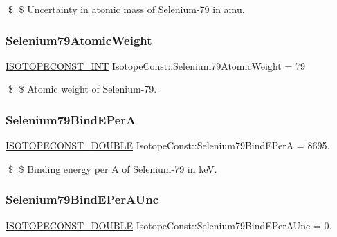 \$ \$ Uncertainty in atomic mass of Selenium-\/79 in amu. \mbox{\label{group___isotope_const-_selenium-_se79_gae9ee15cfff5c3bfa33f2123eeff725ce}} 
\subsubsection{\texorpdfstring{Selenium79\+Atomic\+Weight}{Selenium79AtomicWeight}}
{\footnotesize\ttfamily \mbox{\hyperlink{group___isotope_const-_macros_ga5f18360b3e99483a35c32d789e62621c}{I\+S\+O\+T\+O\+P\+E\+C\+O\+N\+S\+T\+\_\+\+I\+NT}} Isotope\+Const\+::\+Selenium79\+Atomic\+Weight = 79}

\$ \$ Atomic weight of Selenium-\/79. \mbox{\label{group___isotope_const-_selenium-_se79_gab880ba9928fb274d34779e7b46584bb8}} 
\subsubsection{\texorpdfstring{Selenium79\+Bind\+E\+PerA}{Selenium79BindEPerA}}
{\footnotesize\ttfamily \mbox{\hyperlink{group___isotope_const-_macros_ga8f45a7272ce02c0b4c65c44636ed719a}{I\+S\+O\+T\+O\+P\+E\+C\+O\+N\+S\+T\+\_\+\+D\+O\+U\+B\+LE}} Isotope\+Const\+::\+Selenium79\+Bind\+E\+PerA = 8695.}

\$ \$ Binding energy per A of Selenium-\/79 in keV. \mbox{\label{group___isotope_const-_selenium-_se79_ga7a3254cdda87adcdee6bf1a219fd94fe}} 
\subsubsection{\texorpdfstring{Selenium79\+Bind\+E\+Per\+A\+Unc}{Selenium79BindEPerAUnc}}
{\footnotesize\ttfamily \mbox{\hyperlink{group___isotope_const-_macros_ga8f45a7272ce02c0b4c65c44636ed719a}{I\+S\+O\+T\+O\+P\+E\+C\+O\+N\+S\+T\+\_\+\+D\+O\+U\+B\+LE}} Isotope\+Const\+::\+Selenium79\+Bind\+E\+Per\+A\+Unc = 0.}

